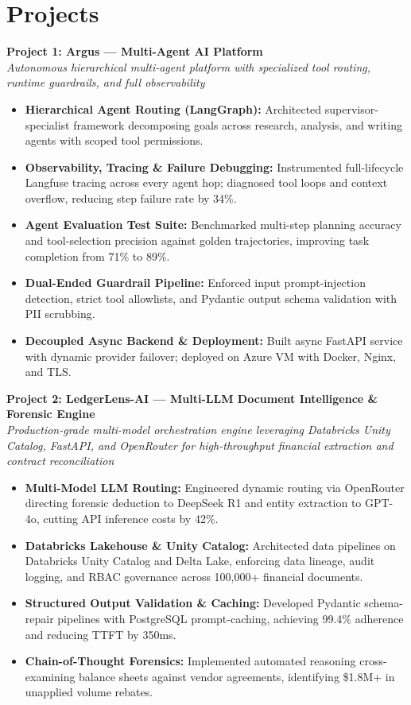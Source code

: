 \documentclass[a4paper,10pt]{article}
\begin{document}
\section{Projects}

\noindent
\textbf{\color{projecttitle}Project 1: Argus — Multi-Agent AI Platform} \\
\textit{\small Autonomous hierarchical multi-agent platform with specialized tool routing, runtime guardrails, and full observability}
\begin{itemize}
    \item \textbf{Hierarchical Agent Routing (LangGraph):} Architected supervisor-specialist framework decomposing goals across research, analysis, and writing agents with scoped tool permissions.
    \item \textbf{Observability, Tracing \& Failure Debugging:} Instrumented full-lifecycle Langfuse tracing across every agent hop; diagnosed tool loops and context overflow, reducing step failure rate by 34\%.
    \item \textbf{Agent Evaluation Test Suite:} Benchmarked multi-step planning accuracy and tool-selection precision against golden trajectories, improving task completion from 71\% to 89\%.
    \item \textbf{Dual-Ended Guardrail Pipeline:} Enforced input prompt-injection detection, strict tool allowlists, and Pydantic output schema validation with PII scrubbing.
    \item \textbf{Decoupled Async Backend \& Deployment:} Built async FastAPI service with dynamic provider failover; deployed on Azure VM with Docker, Nginx, and TLS.
\end{itemize}

\vspace{6pt}

\noindent
\textbf{\color{projecttitle}Project 2: LedgerLens-AI — Multi-LLM Document Intelligence \& Forensic Engine} \\
\textit{\small Production-grade multi-model orchestration engine leveraging Databricks Unity Catalog, FastAPI, and OpenRouter for high-throughput financial extraction and contract reconciliation}
\begin{itemize}
    \item \textbf{Multi-Model LLM Routing:} Engineered dynamic routing via OpenRouter directing forensic deduction to DeepSeek R1 and entity extraction to GPT-4o, cutting API inference costs by 42\%.
    \item \textbf{Databricks Lakehouse \& Unity Catalog:} Architected data pipelines on Databricks Unity Catalog and Delta Lake, enforcing data lineage, audit logging, and RBAC governance across 100,000+ financial documents.
    \item \textbf{Structured Output Validation \& Caching:} Developed Pydantic schema-repair pipelines with PostgreSQL prompt-caching, achieving 99.4\% adherence and reducing TTFT by 350ms.
    \item \textbf{Chain-of-Thought Forensics:} Implemented automated reasoning cross-examining balance sheets against vendor agreements, identifying \$1.8M+ in unapplied volume rebates.
\end{itemize}
\end{document}
